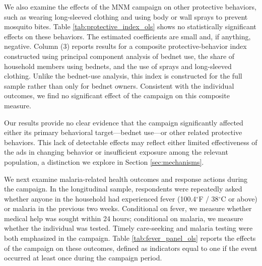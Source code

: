 \begin{table}[h!]
    \centering
    \caption{Other protective behaviors (during the campaign)}
    \footnotesize
    
    \label{tab:protective_index_ols}
\end{table}


We also examine the effects of the MNM campaign on other protective behaviors, such as wearing long-sleeved clothing and using body or wall sprays to prevent mosquito bites. Table \ref{tab:protective_index_ols} shows no statistically significant effects on these behaviors. The estimated coefficients are small and, if anything, negative. Column (3) reports results for a composite protective-behavior index constructed using principal component analysis of bednet use, the share of household members using bednets, and the use of sprays and long-sleeved clothing. Unlike the bednet-use analysis, this index is constructed for the full sample rather than only for bednet owners. Consistent with the individual outcomes, we find no significant effect of the campaign on this composite measure.

Our results provide no clear evidence that the campaign significantly affected either its primary behavioral target---bednet use---or other related protective behaviors. This lack of detectable effects may reflect either limited effectiveness of the ads in changing behavior or insufficient exposure among the relevant population, a distinction we explore in Section \ref{sec:mechanisms}.


\begin{table}[h!]
    \centering
    \caption{Incidence of fever, care-seeking, and malaria outcomes  (during the campaign)}
    \footnotesize
    
    \label{tab:fever_panel_ols}
\end{table}

We next examine malaria-related health outcomes and response actions during the campaign. In the longitudinal sample, respondents were repeatedly asked whether anyone in the household had experienced fever (100.4$^\circ$F / 38$^\circ$C or above) or malaria in the previous two weeks. Conditional on fever, we measure whether medical help was sought within 24 hours; conditional on malaria, we measure whether the individual was tested. Timely care-seeking and malaria testing were both emphasized in the campaign. Table \ref{tab:fever_panel_ols} reports the effects of the campaign on these outcomes, defined as indicators equal to one if the event occurred at least once during the campaign period.

